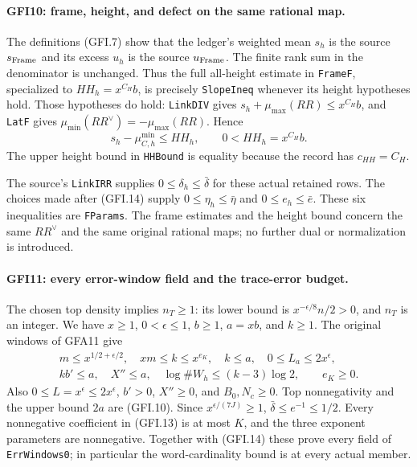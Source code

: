 \paragraph{GFI10: frame, height, and defect on the same rational map.}
\label{claim:GFI10}
The definitions (GFI.7) show that the ledger's weighted mean $s_h$
is the source $s_{\rm Frame}$ and its excess $u_h$ is the source
$u_{\rm Frame}$.  The finite rank sum in the denominator is unchanged.
Thus the full all-height estimate in \texttt{FrameF}, specialized
to $HH_h=x^{C_H}b$, is precisely \texttt{SlopeIneq} whenever its
height hypotheses hold.  Those hypotheses do hold: \texttt{LinkDIV}
gives $s_h+\mu_{\max}(RR)\le x^{C_H}b$, and \texttt{LatF}
gives $\mu_{\min}(RR^\vee)=-\mu_{\max}(RR)$.
Hence
\[
 s_h-\mu^{\min}_{C,h}\le HH_h,
 \qquad 0<HH_h=x^{C_H}b.                               \tag{GFI.20}
\]
The upper height bound in \texttt{HHBound} is equality because
the record has $c_{HH}=C_H$.

The source's \texttt{LinkIRR} supplies
$0\le\delta_h\le\bar\delta$ for these actual retained rows.
The choices made after (GFI.14) supply
$0\le\eta_h\le\bar\eta$ and $0\le e_h\le\bar e$.
These six inequalities are \texttt{FParams}.  The frame estimates
and the height bound concern the same $RR^\vee$ and the same
original rational maps; no further dual or normalization is introduced.

\paragraph{GFI11: every error-window field and the trace-error budget.}
\label{claim:GFI11}
The chosen top density implies $n_T\ge1$: its lower bound is
$x^{-\epsilon/8}n/2>0$, and $n_T$ is an integer.  We have $x\ge1$,
$0<\epsilon\le1$, $b\ge1$, $a=xb$, and $k\ge1$.
The original windows of GFA11 give
\[
\begin{gathered}
 m\le x^{1/2+\epsilon/2},\quad xm\le k\le x^{e_K},\quad
 k\le a,\quad 0\le L_a\le2x^\epsilon,\\
 kb'\le a,\quad X''\le a,\quad
 \log\#W_h\le(k-3)\log2,
 \qquad e_K\ge0.                                      \tag{GFI.21}
\end{gathered}
\]
Also $0\le L=x^\epsilon\le2x^\epsilon$, $b'>0$, $X''\ge0$,
and $B_0,N_c\ge0$.  Top nonnegativity and the upper bound $2a$
are (GFI.10).  Since $x^{\epsilon/(7J)}\ge1$,
$\bar\delta\le e^{-1}\le1/2$.  Every nonnegative coefficient
in (GFI.13) is at most $K$, and the three exponent parameters
are nonnegative.  Together with (GFI.14) these prove every field
of \texttt{ErrWindows0}; in particular the word-cardinality bound
is at every actual member.

